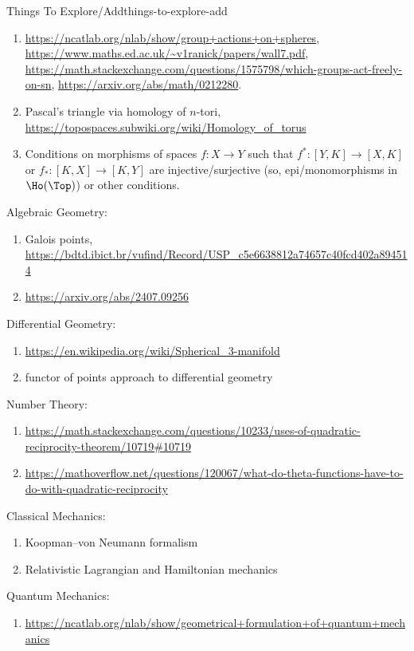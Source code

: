 \begin{remark}{Things To Explore/Add}{things-to-explore-add}
\begin{enumerate}
        \item \url{https://ncatlab.org/nlab/show/group+actions+on+spheres}, \url{https://www.maths.ed.ac.uk/~v1ranick/papers/wall7.pdf}, \url{https://math.stackexchange.com/questions/1575798/which-groups-act-freely-on-sn}, \url{https://arxiv.org/abs/math/0212280}.
        \item Pascal's triangle via homology of $n$-tori, \url{https://topospaces.subwiki.org/wiki/Homology_of_torus}
        \item Conditions on morphisms of spaces $f\colon X\to Y$ such that $f^{*}\colon[Y,K]\to[X,K]$ or $f_{*}\colon[K,X]\to[K,Y]$ are injective/surjective (so, epi/monomorphisms in $\Ho(\Top)$) or other conditions.
    \end{enumerate}
    Algebraic Geometry:
    \begin{enumerate}
        \item Galois points, \url{https://bdtd.ibict.br/vufind/Record/USP_c5e6638812a74657c40fcd402a894514}
        \item \url{https://arxiv.org/abs/2407.09256}
    \end{enumerate}
    Differential Geometry:
    \begin{enumerate}
        \item \url{https://en.wikipedia.org/wiki/Spherical\_3-manifold}
        \item functor of points approach to differential geometry
    \end{enumerate}
    Number Theory:
    \begin{enumerate}
        \item \url{https://math.stackexchange.com/questions/10233/uses-of-quadratic-reciprocity-theorem/10719#10719}
        \item \url{https://mathoverflow.net/questions/120067/what-do-theta-functions-have-to-do-with-quadratic-reciprocity}
    \end{enumerate}
    Classical Mechanics:
    \begin{enumerate}
        \item Koopman--von Neumann formalism
        \item Relativistic Lagrangian and Hamiltonian mechanics
    \end{enumerate}
    Quantum Mechanics:
    \begin{enumerate}
        \item \url{https://ncatlab.org/nlab/show/geometrical+formulation+of+quantum+mechanics}
    \end{enumerate}

\end{remark}
